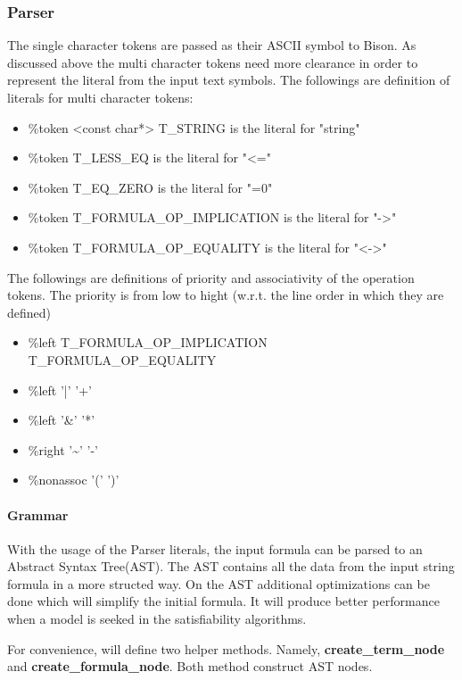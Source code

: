 \documentclass{article}
\begin{document}
	\subsubsection{Parser}
			The single character tokens are passed as their ASCII symbol to Bison. 
			As discussed above the multi character tokens need more clearance in order to represent the literal from the input text symbols.
			The followings are definition of literals for multi character tokens:
			\begin{itemize}
				\item \%token <const char*> T\_STRING is the literal for "string"
				\item \%token T\_LESS\_EQ is the literal for "<="
				\item \%token T\_EQ\_ZERO is the literal for "=0"
				\item \%token T\_FORMULA\_OP\_IMPLICATION is the literal for "->"
				\item \%token T\_FORMULA\_OP\_EQUALITY is the literal for "<->"
			\end{itemize}
			The followings are definitions of priority and associativity of the operation tokens. 
			The priority is from low to hight (w.r.t. the line order in which they are defined)
			\begin{itemize}
				\item \%left T\_FORMULA\_OP\_IMPLICATION T\_FORMULA\_OP\_EQUALITY
				\item \%left '|' '+'
				\item \%left '\&' '*'
				\item \%right '\textasciitilde' '-'
				\item \%nonassoc '(' ')'
			\end{itemize}

		\paragraph{Grammar}
			With the usage of the Parser literals, the input formula can be parsed to an Abstract Syntax Tree(AST).
			The AST contains all the data from the input string formula in a more structed way.
			On the AST additional optimizations can be done which will simplify the initial formula. It will produce better performance when a model is seeked in the satisfiability algorithms.

			For convenience, will define two helper methods. Namely, \textbf{create\_term\_node} and \textbf{create\_formula\_node}. Both method construct AST nodes.
\end{document}
